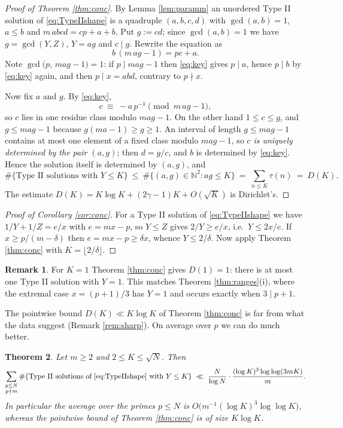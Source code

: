 \documentclass[11pt,reqno]{amsart}
\theoremstyle{plain}
\newtheorem{theorem}{Theorem}[section]
\theoremstyle{definition}
\newtheorem{remark}[theorem]{Remark}
\numberwithin{equation}{section}
\newcommand{\N}{\mathbb{N}}
\begin{document}
\begin{proof}[Proof of Theorem \ref{thm:conc}]
By Lemma \ref{lem:paramm} an unordered Type II solution of \eqref{eq:TypeIIshape} is a
quadruple $(a,b,c,d)$ with $\gcd(a,b)=1$, $a\le b$ and $m\,abcd=cp+a+b$. Put
$g:=cd$; since $\gcd(a,b)=1$ we have $g=\gcd(Y,Z)$, $Y=ag$ and $c\mid g$. Rewrite the
equation as
\begin{equation}\label{eq:key}
  b\,(m\,ag-1)=pc+a .
\end{equation}
Note $\gcd\bigl(p,\,mag-1\bigr)=1$: if $p\mid mag-1$ then \eqref{eq:key} gives
$p\mid a$, hence $p\mid b$ by \eqref{eq:key} again, and then $p\mid x=abd$, contrary
to $p\nmid x$.

Now fix $a$ and $g$. By \eqref{eq:key},
\[
  c\ \equiv\ -a\,p^{-1}\pmod{m\,ag-1},
\]
so $c$ lies in one residue class modulo $mag-1$. On the other hand $1\le c\le g$, and
$g\le mag-1$ because $g(ma-1)\ge g\ge1$. An interval of length $g\le mag-1$ contains at
most one element of a fixed class modulo $mag-1$, so \emph{$c$ is uniquely determined
by the pair $(a,g)$}; then $d=g/c$, and $b$ is determined by \eqref{eq:key}. Hence the
solution itself is determined by $(a,g)$, and
\[
  \#\{\text{Type II solutions with }Y\le K\}\ \le\ \#\{(a,g)\in\N^{2}:ag\le K\}
  \ =\ \sum_{n\le K}\tau(n)\ =\ D(K).
\]
The estimate $D(K)=K\log K+(2\gamma-1)K+O(\sqrt K)$ is Dirichlet's.
\end{proof}

\begin{proof}[Proof of Corollary \ref{cor:conc}]
For a Type II solution of \eqref{eq:TypeIIshape} we have $1/Y+1/Z=e/x$ with $e=mx-p$, so
$Y\le Z$ gives $2/Y\ge e/x$, i.e.\ $Y\le2x/e$. If $x\ge p/(m-\delta)$ then
$e=mx-p\ge\delta x$, whence $Y\le2/\delta$. Now apply Theorem \ref{thm:conc} with
$K=\lfloor2/\delta\rfloor$.
\end{proof}

\begin{remark}
For $K=1$ Theorem \ref{thm:conc} gives $D(1)=1$: there is at most one
Type II solution with $Y=1$. This matches Theorem \ref{thm:ranges}(i), where the
extremal case $x=(p+1)/3$ has $Y=1$ and occurs exactly when $3\mid p+1$.
\end{remark}

The pointwise bound $D(K)\ll K\log K$ of Theorem \ref{thm:conc} is far from what the
data suggest (Remark \ref{rem:sharp}). On average over $p$ we can do much better.

\begin{theorem}\label{thm:avg}
Let $m\ge2$ and $2\le K\le\sqrt N$. Then
\[
  \sum_{\substack{p\le N\\ p\,\nmid\,m}}
  \#\{\text{Type II solutions of \eqref{eq:TypeIIshape} with }Y\le K\}
  \ \ll\ \frac{N}{\log N}\cdot\frac{(\log K)^{3}\log\log(3mK)}{m}.
\]
In particular the average over the primes $p\le N$ is $O\bigl(m^{-1}(\log K)^{3}\log\log K\bigr)$,
whereas the pointwise bound of Theorem \ref{thm:conc} is of size $K\log K$.
\end{theorem}
\end{document}
